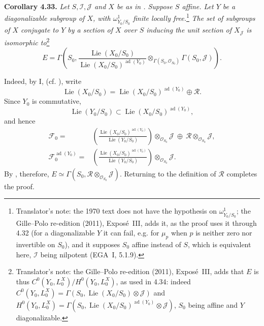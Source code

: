 \medskip
\noindent{}\textbf{Corollary 4.33.}
\textit{Let \(S,\mathscr I,\mathscr J\) and \(X\) be as in . Suppose
\(S\) affine. Let \(Y\) be a diagonalizable subgroup of \(X\), with
\(\omega^1_{Y_0/S_0}\) finite locally free.}\footnote{Translator's note: the
1970 text does not have the hypothesis on \(\omega^1_{Y_0/S_0}\); the
Gille--Polo re-edition (2011), Exposé~III, adds it, as the proof uses it
through 4.32 (for a diagonalizable \(Y\) it can fail, e.g. for \(\mu_p\) when
\(p\) is neither zero nor invertible on \(S_0\)), and it supposes \(S_0\)
affine instead of \(S\), which is equivalent here, \(\mathscr I\) being
nilpotent (EGA~I, 5.1.9).} \textit{The set of
subgroups of \(X\) conjugate to \(Y\) by a section of \(X\) over
\(S\) inducing the unit section of \(X_{\mathscr J}\) is isomorphic
to}\footnote{Translator's note: the Gille--Polo re-edition (2011), Exposé~III, adds that \(E\) is thus
\(C^0(Y_0,L_0^X)/H^0(Y_0,L_0^X)\), as used in 4.34: indeed
\(C^0(Y_0,L_0^X)=\Gamma(S_0,\operatorname{Lie}(X_0/S_0)\otimes\mathscr J)\) and
\(H^0(Y_0,L_0^X)=\Gamma(S_0,\operatorname{Lie}(X_0/S_0)^{\operatorname{ad}(Y_0)}
\otimes\mathscr J)\), \(S_0\) being affine and \(Y\) diagonalizable.}
\[
 E=\Gamma\!\left(
 S_0,
 \frac{\operatorname{Lie}(X_0/S_0)}
      {\operatorname{Lie}(X_0/S_0)^{\operatorname{ad}(Y_0)}}
 \otimes_{\Gamma(S_0,\mathscr O_{S_0})}\Gamma(S_0,\mathscr J)
 \right).
\]

Indeed, by I,  (cf. ), write
\[
 \operatorname{Lie}(X_0/S_0)
 =\operatorname{Lie}(X_0/S_0)^{\operatorname{ad}(Y_0)}
  \oplus\mathscr R.
\]
Since \(Y_0\) is commutative,
\[
 \operatorname{Lie}(Y_0/S_0)
 \subset\operatorname{Lie}(X_0/S_0)^{\operatorname{ad}(Y_0)},
\]
and hence
\[
 \begin{aligned}
 \mathscr F_0={}&
 \left(
  \frac{\operatorname{Lie}(X_0/S_0)^{\operatorname{ad}(Y_0)}}
       {\operatorname{Lie}(Y_0/S_0)}
 \right)\otimes_{\mathscr O_{S_0}}\mathscr J
 \ \oplus\ \mathscr R\otimes_{\mathscr O_{S_0}}\mathscr J,\\
 \mathscr F_0^{\operatorname{ad}(Y_0)}={}&
 \left(
  \frac{\operatorname{Lie}(X_0/S_0)^{\operatorname{ad}(Y_0)}}
       {\operatorname{Lie}(Y_0/S_0)}
 \right)\otimes_{\mathscr O_{S_0}}\mathscr J.
 \end{aligned}
\]
By , therefore,
\(E\simeq
\Gamma(S_0,\mathscr R\otimes_{\mathscr O_{S_0}}\mathscr J)\).
Returning to the definition of \(\mathscr R\) completes the proof.

